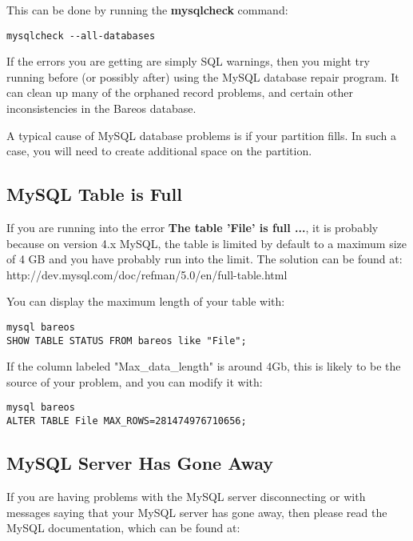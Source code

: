 This can be done by running the {\bf mysqlcheck } command:
\footnotesize
\begin{verbatim}
mysqlcheck --all-databases
\end{verbatim}
\normalsize

If the errors you are getting are simply SQL warnings, then you might try
running  before (or possibly after) using the MySQL database repair
program. It can clean up many of the orphaned record problems, and certain
other inconsistencies in the Bareos database.

A typical cause of MySQL database problems is if your partition fills. In
such a case, you will need to create additional space on the partition.


\subsection{MySQL Table is Full}

If you are running into the error {\bf The table 'File' is full ...},
it is probably because on version 4.x MySQL, the table is limited by
default to a maximum size of 4 GB and you have probably run into
the limit. The solution can be found at:
{http://dev.mysql.com/doc/refman/5.0/en/full-table.html}

You can display the maximum length of your table with:

\footnotesize
\begin{verbatim}
mysql bareos
SHOW TABLE STATUS FROM bareos like "File";
\end{verbatim}
\normalsize

If the column labeled "Max\_data\_length" is around 4Gb, this is likely
to be the source of your problem, and you can modify it with:

\footnotesize
\begin{verbatim}
mysql bareos
ALTER TABLE File MAX_ROWS=281474976710656;
\end{verbatim}
\normalsize


\subsection{MySQL Server Has Gone Away}
If you are having problems with the MySQL server disconnecting or with
messages saying that your MySQL server has gone away, then please read
the MySQL documentation, which can be found at:

